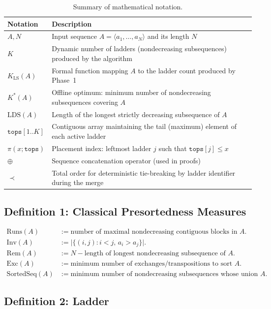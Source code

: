 \documentclass[12pt,a4paper]{article}
\theoremstyle{plain}
\theoremstyle{definition}
\begin{document}
\begin{table}[h]
\centering
\caption{Summary of mathematical notation.}
\label{tab:notation}
\begin{tabular}{ll}
\toprule
Notation & Description \\
\midrule
$A,N$ & Input sequence $A=\langle a_1,\ldots,a_N\rangle$ and its length $N$ \\
$K$ & Dynamic number of ladders (nondecreasing subsequences) produced by the algorithm \\
$K_{\mathrm{LS}}(A)$ & Formal function mapping $A$ to the ladder count produced by Phase~1 \\
$K^*(A)$ & Offline optimum: minimum number of nondecreasing subsequences covering $A$ \\
$\mathrm{LDS}(A)$ & Length of the longest strictly decreasing subsequence of $A$ \\
$\mathtt{tops}[1..K]$ & Contiguous array maintaining the tail (maximum) element of each active ladder \\
$\pi(x;\mathtt{tops})$ & Placement index: leftmost ladder $j$ such that $\mathtt{tops}[j] \leq x$ \\
$\oplus$ & Sequence concatenation operator (used in proofs) \\
$\prec$ & Total order for deterministic tie-breaking by ladder identifier during the merge \\
\bottomrule
\end{tabular}
\end{table}
 
\subsection{Definition 1: Classical Presortedness Measures}
 
\begin{align}
\mathrm{Runs}(A) &:= \text{number of maximal nondecreasing contiguous blocks in }A. \\
\mathrm{Inv}(A) &:= \bigl|\{(i,j) : i < j,\, a_i > a_j\}\bigr|. \\
\mathrm{Rem}(A) &:= N - \text{length of longest nondecreasing subsequence of }A. \\
\mathrm{Exc}(A) &:= \text{minimum number of exchanges/transpositions to sort }A. \\
\mathrm{SortedSeq}(A) &:= \text{minimum number of nondecreasing subsequences whose union covers }A.
\end{align}
 
\subsection{Definition 2: Ladder}
 
\end{document}
